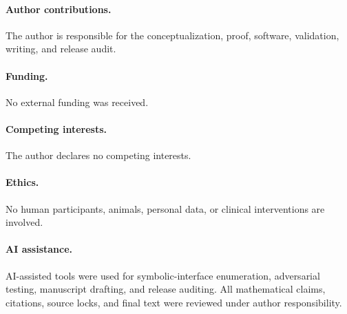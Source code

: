 \documentclass[11pt]{article}
\theoremstyle{definition}
\theoremstyle{remark}
\begin{document}
\paragraph{Author contributions.}
The author is responsible for the conceptualization, proof, software,
validation, writing, and release audit.

\paragraph{Funding.}
No external funding was received.

\paragraph{Competing interests.}
The author declares no competing interests.

\paragraph{Ethics.}
No human participants, animals, personal data, or clinical interventions
are involved.

\paragraph{AI assistance.}
AI-assisted tools were used for symbolic-interface enumeration,
adversarial testing, manuscript drafting, and release auditing.  All
mathematical claims, citations, source locks, and final text were reviewed
under author responsibility.



\end{document}
